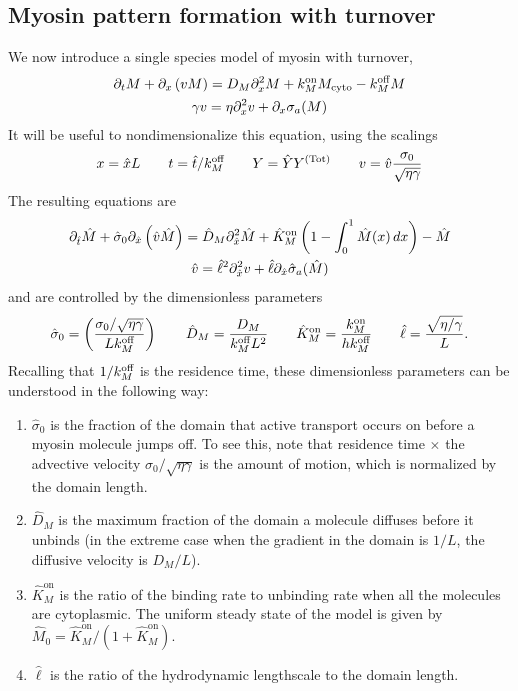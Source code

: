 \documentclass[11pt]{article}
\newcommand{\6}[1]{#1_{\text{6}}}
\newcommand{\3}[1]{#1_{\text{3}}}
\newcommand{\Tot}[1]{#1^\text{(Tot)}}
\newcommand{\My}[1]{#1_M}
\begin{document}
\subsection{Myosin pattern formation with turnover}
We now introduce a single species model of myosin with turnover, 
\begin{subequations}
\begin{gather}
\Dt M + \Dx \left(v M\right) = D_M \Dx^2 M +\My{\kon}M_\text{cyto} - \My{\koff} M \\
\label{eq:veleqndim}
\gamma v = \eta \Dx^2 v + \Dx \sigma_a(M)
\end{gather}
\end{subequations}
It will be useful to nondimensionalize this equation, using the scalings
\begin{equation}
\label{eq:NDD}
x = \hat{x} L \qquad t= \hat{t}/\My{\koff} \qquad Y= \hat{Y}\Tot{Y} \qquad v = \hat{v} \frac{\sigma_0}{\sqrt{\eta \gamma}}
\end{equation}
The resulting equations are 
\begin{subequations}
\begin{gather}
\label{eq:MND}
\partial_{\hat{t}} \hat{M} +\hat{\sigma}_0  \partial_{\hat{x}} \left(\hat{v} \hat{M} \right) =\hat{D}_M \partial_{\hat{x}}^2 \hat{M} +\hat{K}^\text{on}_M \left(1-\int_0^1  \hat{M}(x) \, dx\right) - \hat{M}\\
\label{eq:MVND}
\hat{v} = \hat{\ell}^2 \partial_{\hat{x}}^2 v +\hat{\ell} \partial_{\hat{x}} \hat{\sigma}_a(\hat{M})
 \end{gather}
\end{subequations}
and are controlled by the dimensionless parameters
\begin{equation}
\label{eq:NDparams}
\hat{\sigma}_0 = \left(\frac{\sigma_0/ \sqrt{\eta \gamma} }{L \My{\koff}}\right)   \qquad \hat{D}_M =\frac{D_M}{\My{\koff}  L^2} \qquad \hat{K}^\text{on}_M= \frac{\My{\kon}}{h \My{\koff}} \qquad \hat{\ell} = \frac{\sqrt{\eta/\gamma}}{L}.
\end{equation}
Recalling that $1/\My{\koff}$ is the residence time, these dimensionless parameters can be understood in the following way: 
\begin{enumerate}
\item $\hat{\sigma}_0$ is the fraction of the domain that active transport occurs on before a myosin molecule jumps off. To see this, note that residence time $\times$ the advective velocity $\sigma_0 / \sqrt{\eta \gamma}$ is the amount of motion, which is normalized by the domain length.
\item $\hat{D}_M$ is the maximum fraction of the domain a molecule diffuses before it unbinds (in the extreme case when the gradient in the domain is $1/L$, the diffusive velocity is $D_M/L$). 
\item $\hat{K}^\text{on}_M$ is the ratio of the binding rate to unbinding rate when all the molecules are cytoplasmic. The uniform steady state of the model is given by $\hat{M}_0= \hat{K}^\text{on}_M/\left(1+\hat{K}^\text{on}_M\right)$.
\item $\hat{\ell}$ is the ratio of the hydrodynamic lengthscale to the domain length.
\end{enumerate}
\end{document}
